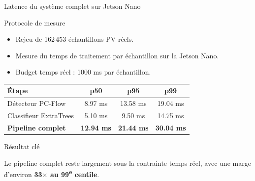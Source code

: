 \documentclass[10pt,aspectratio=169]{beamer}
\begin{document}
\begin{frame}{Latence du système complet sur Jetson Nano}

\begin{block}{Protocole de mesure}
\begin{itemize}
  \item Rejeu de 162\,453 échantillons PV réels.
  \item Mesure du temps de traitement par échantillon sur la Jetson Nano.
  \item Budget temps réel : 1000 ms par échantillon.
\end{itemize}
\end{block}

\vspace{0.2cm}

\centering
\begin{tabular}{lccc}
\toprule
\textbf{Étape} & \textbf{p50} & \textbf{p95} & \textbf{p99} \\
\midrule
Détecteur PC-Flow & 8.97 ms & 13.58 ms & 19.04 ms \\
Classifieur ExtraTrees & 5.10 ms & 9.50 ms & 14.75 ms \\
\textbf{Pipeline complet} & \textbf{12.94 ms} & \textbf{21.44 ms} & \textbf{30.04 ms} \\
\bottomrule
\end{tabular}

\vspace{0.15cm}

\begin{block}{Résultat clé}
\vspace{0.1cm}

\centering
\small
Le pipeline complet reste largement sous la contrainte temps réel, avec une marge d'environ
\textbf{33$\times$ au 99\textsuperscript{e} centile}.
\end{block}

\end{frame} 
\end{document}
